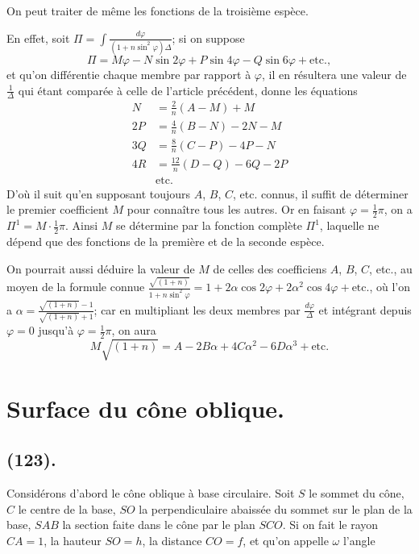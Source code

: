 \documentclass{article}
\begin{document}
On peut traiter de même les fonctions de la troisième espèce.

En effet, soit $\Pi=\displaystyle\int\frac{d\varphi}{(1+n\sin^{2}\varphi)\Delta}$; si on suppose
\[ \Pi=M\varphi-N\sin2\varphi+P\sin4\varphi-Q\sin6\varphi+\text{etc.}, \]
et qu'on différentie chaque membre par rapport à $\varphi$, il en résultera une valeur de $\frac{1}{\Delta}$ qui étant comparée à celle de l'article précédent, donne les équations
\[ \begin{aligned} N&=\frac{2}{n}(A-M)+M\\ 2P&=\frac{4}{n}(B-N)-2N-M\\ 3Q&=\frac{8}{n}(C-P)-4P-N\\ 4R&=\frac{12}{n}(D-Q)-6Q-2P\\ &\text{etc.} \end{aligned} \]
D'où il suit qu'en supposant toujours $A$, $B$, $C$, etc. connus, il suffit de déterminer le premier coefficient $M$ pour connaître tous les autres. Or en faisant $\varphi=\frac{1}{2}\pi$, on a $\Pi^{1}=M\cdot\frac{1}{2}\pi$. Ainsi $M$ se détermine par la fonction complète $\Pi^{1}$, laquelle ne dépend que des fonctions de la première et de la seconde espèce.

On pourrait aussi déduire la valeur de $M$ de celles des coefficiens $A$, $B$, $C$, etc., au moyen de la formule connue $\frac{\sqrt{(1+n)}}{1+n\sin^{2}\varphi}=1+2\alpha\cos2\varphi+2\alpha^{2}\cos4\varphi+\text{etc.}$, où l'on a $\alpha=\frac{\sqrt{(1+n)}-1}{\sqrt{(1+n)}+1}$; car en multipliant les deux membres par $\frac{d\varphi}{\Delta}$ et intégrant depuis $\varphi=0$ jusqu'à $\varphi=\frac{1}{2}\pi$, on aura
\[ M\sqrt{(1+n)}=A-2B\alpha+4C\alpha^{2}-6D\alpha^{3}+\text{etc.} \]

\section*{Surface du cône oblique.}

\subsection*{(123).}


Considérons d'abord le cône oblique à base circulaire. Soit $S$ le sommet du cône, $C$ le centre de la base, $SO$ la perpendiculaire abaissée du sommet sur le plan de la base, $SAB$ la section faite dans le cône par le plan $SCO$. Si on fait le rayon $CA=1$, la hauteur $SO=h$, la distance $CO=f$, et qu'on appelle $\omega$ l'angle
\end{document}
